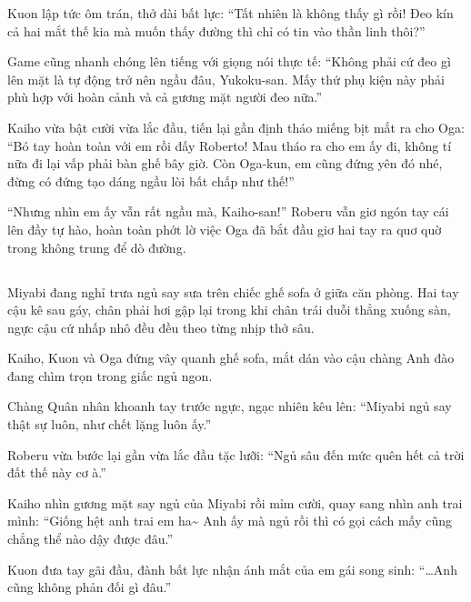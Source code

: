 \documentclass[../main.tex]{subfiles}
\begin{document}
Kuon lập tức ôm trán, thở dài bất lực: ``Tất nhiên là không thấy gì rồi! Đeo kín cả hai mắt thế kia mà muốn thấy đường thì chỉ có tin vào thần linh thôi?''

Game cũng nhanh chóng lên tiếng với giọng nói thực tế: ``Không phải cứ đeo gì lên mặt là tự động trở nên ngầu đâu, Yukoku-san. Mấy thứ phụ kiện này phải phù hợp với hoàn cảnh và cả gương mặt người đeo nữa.''

Kaiho vừa bật cười vừa lắc đầu, tiến lại gần định tháo miếng bịt mắt ra cho Oga: ``Bó tay hoàn toàn với em rồi đấy Roberto! Mau tháo ra cho em ấy đi, không tí nữa đi lại vấp phải bàn ghế bây giờ. Còn Oga-kun, em cũng đứng yên đó nhé, đừng có đứng tạo dáng ngầu lòi bất chấp như thế!''

``Nhưng nhìn em ấy vẫn rất ngầu mà, Kaiho-san!'' Roberu vẫn giơ ngón tay cái lên đầy tự hào, hoàn toàn phớt lờ việc Oga đã bắt đầu giơ hai tay ra quơ quờ trong không trung để dò đường.

\newpage

\subsection*{\label{ep-M8.II}}
\vspace{-4pt}

Miyabi đang nghỉ trưa ngủ say sưa trên chiếc ghế sofa ở giữa căn phòng. Hai tay cậu kê sau gáy, chân phải hơi gập lại trong khi chân trái duỗi thẳng xuống sàn, ngực cậu cứ nhấp nhô đều đều theo từng nhịp thở sâu.


Kaiho, Kuon và Oga đứng vây quanh ghế sofa, mắt dán vào cậu chàng Anh đào đang chìm trọn trong giấc ngủ ngon.

Chàng Quân nhân khoanh tay trước ngực, ngạc nhiên kêu lên: ``Miyabi ngủ say thật sự luôn, như chết lặng luôn ấy.''

Roberu vừa bước lại gần vừa lắc đầu tặc lưỡi: ``Ngủ sâu đến mức quên hết cả trời đất thế này cơ à.''

Kaiho nhìn gương mặt say ngủ của Miyabi rồi mỉm cười, quay sang nhìn anh trai mình: ``Giống hệt anh trai em ha\~{} Anh ấy mà ngủ rồi thì có gọi cách mấy cũng chẳng thể nào dậy được đâu.''

Kuon đưa tay gãi đầu, đành bất lực nhận ánh mắt của em gái song sinh: ``\dots Anh cũng không phản đối gì đâu.''
\end{document}
